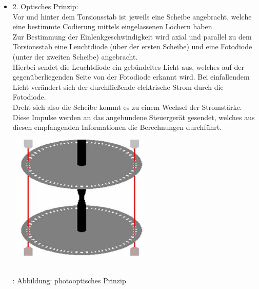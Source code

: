 \documentclass{article}
\begin{document}
\begin{itemize}
	
					\item 2. Optisches Prinzip:\\
							Vor und hinter dem Torsionsstab ist jeweils eine Scheibe angebracht, welche eine bestimmte Codierung mittels eingelassenen Löchern haben.\\
							Zur Bestimmung der Einlenkgeschwindigkeit wird axial und parallel zu dem Torsionsstab eine Leuchtdiode (über der ersten Scheibe) und eine Fotodiode (unter der zweiten Scheibe) angebracht. \\
							Hierbei sendet die Leuchtdiode ein gebündeltes Licht aus, welches auf der gegenüberliegenden Seite von der Fotodiode erkannt wird. Bei einfallendem Licht verändert sich der durchfließende elektrische Strom durch die Fotodiode.\\
							Dreht sich also die Scheibe kommt es zu einem Wechsel der Stromstärke. Diese Impulse werden an das angebundene Steuergerät gesendet, welches aus diesen empfangenden Informationen die Berechnungen durchführt.\\
							
							\begin{center}
								\includegraphics[width=7cm, height=6cm] {Images/Kapitel5/photoelektrisch.png}
 								\caption {\\\cite{TS14}: Abbildung: photooptisches Prinzip}
							\end{center}	

				\end{itemize}
\end{document}

